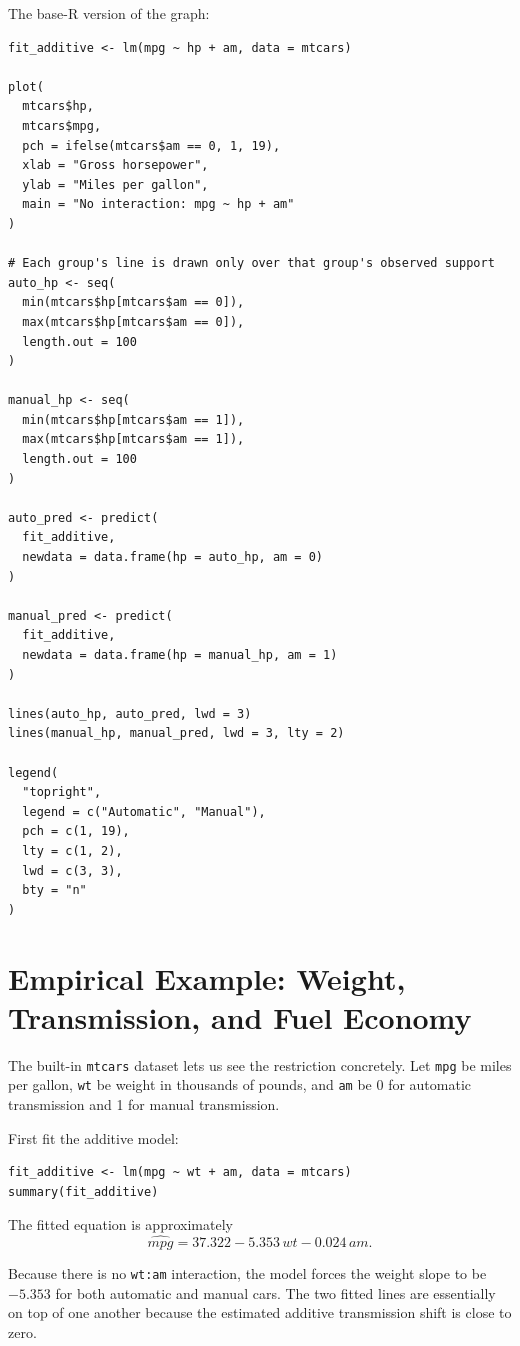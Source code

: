 \documentclass[11pt]{report}
\begin{document}
The base-R version of the graph:

\begin{lstlisting}
fit_additive <- lm(mpg ~ hp + am, data = mtcars)

plot(
  mtcars$hp,
  mtcars$mpg,
  pch = ifelse(mtcars$am == 0, 1, 19),
  xlab = "Gross horsepower",
  ylab = "Miles per gallon",
  main = "No interaction: mpg ~ hp + am"
)

# Each group's line is drawn only over that group's observed support
auto_hp <- seq(
  min(mtcars$hp[mtcars$am == 0]),
  max(mtcars$hp[mtcars$am == 0]),
  length.out = 100
)

manual_hp <- seq(
  min(mtcars$hp[mtcars$am == 1]),
  max(mtcars$hp[mtcars$am == 1]),
  length.out = 100
)

auto_pred <- predict(
  fit_additive,
  newdata = data.frame(hp = auto_hp, am = 0)
)

manual_pred <- predict(
  fit_additive,
  newdata = data.frame(hp = manual_hp, am = 1)
)

lines(auto_hp, auto_pred, lwd = 3)
lines(manual_hp, manual_pred, lwd = 3, lty = 2)

legend(
  "topright",
  legend = c("Automatic", "Manual"),
  pch = c(1, 19),
  lty = c(1, 2),
  lwd = c(3, 3),
  bty = "n"
)
\end{lstlisting}

\section{Empirical Example: Weight, Transmission, and Fuel Economy}

The built-in \texttt{mtcars} dataset lets us see the restriction concretely. Let \texttt{mpg} be miles per gallon, \texttt{wt} be weight in thousands of pounds, and \texttt{am} be 0 for automatic transmission and 1 for manual transmission.

First fit the additive model:

\begin{lstlisting}
fit_additive <- lm(mpg ~ wt + am, data = mtcars)
summary(fit_additive)
\end{lstlisting}

The fitted equation is approximately
\[
\widehat{mpg}
=
37.322
-5.353\,wt
-0.024\,am.
\]

Because there is no \texttt{wt:am} interaction, the model forces the weight slope to be \(-5.353\) for both automatic and manual cars. The two fitted lines are essentially on top of one another because the estimated additive transmission shift is close to zero.
\end{document}
